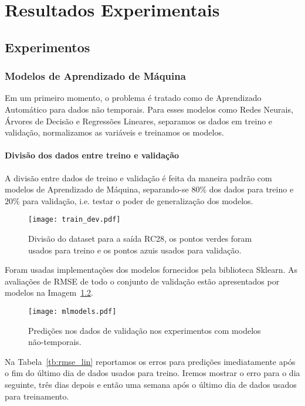 \chapter{ Resultados Experimentais }
\label{cap:resultados}
\section{Experimentos}



\subsection{Modelos de Aprendizado de Máquina}


Em um primeiro momento, o problema é tratado como de Aprendizado Automático para
dados não temporais. Para esses modelos como Redes Neurais, Árvores de Decisão e Regressões
Lineares, separamos os dados em treino e validação, normalizamos as variáveis e
treinamos os modelos. 

\subsubsection{Divisão dos dados entre treino e validação}


A divisão entre dados de treino e validação é feita da maneira padrão com
modelos de Aprendizado de Máquina, separando-se $80\%$ dos dados para treino e
$20\%$ para validação, i.e. testar o poder de generalização dos modelos. 

\begin{figure}[H]
  \centering
  \texttt{[image: train\_dev.pdf]}
  \caption{Divisão do dataset para a saída RC28, os pontos verdes foram usados para
    treino e os pontos azuis usados para validação.}
  \label{fig:divrc28}
\end{figure}

Foram usadas implementações dos modelos fornecidos pela biblioteca Sklearn.
As avaliações de RMSE de todo o conjunto de validação estão apresentados por modelos na Imagem~\ref{fig:mlmodels}.  

\begin{figure}[H]
  \centering
\texttt{[image: mlmodels.pdf]}
\caption{Predições nos dados de validação nos experimentos com modelos não-temporais. }
\label{fig:mlmodels}
\end{figure}

Na Tabela~\ref{tb:rmse_lin} reportamos os erros para predições imediatamente
após o fim do último dia de dados usados para treino. Iremos mostrar o
erro para o dia seguinte, três dias depois e então uma semana após o último dia
de dados usados para treinamento.

